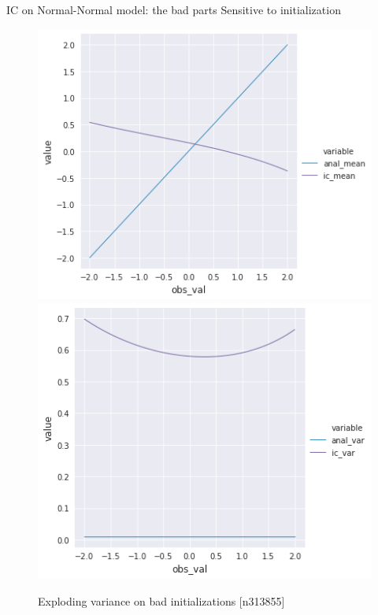 \documentclass{beamer}
\begin{document}
\begin{frame}[fragile]{IC on Normal-Normal model: the bad parts}
    Sensitive to initialization
    \begin{figure}
        \centering
        \includegraphics[width=0.48\linewidth]{figures/ic_normal_normal_fail_mean.png}
        \includegraphics[width=0.48\linewidth]{figures/ic_normal_normal_fail_var.png}
        \caption{Exploding variance on bad initializations [n313855]}
    \end{figure}
\end{frame}
\end{document}
